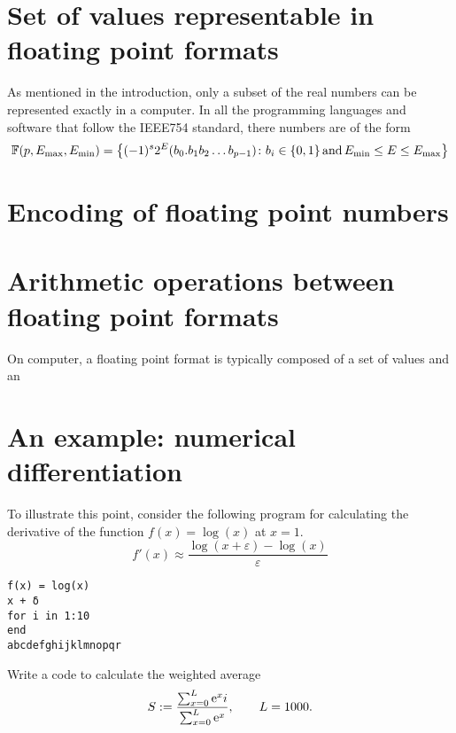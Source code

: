 \section{Set of values representable in floating point formats}%
\label{sec:set_of_values}
As mentioned in the introduction,
only a subset of the real numbers can be represented exactly in a computer.
In all the programming languages and software that follow the IEEE754 standard,
there numbers are of the form
\[
    \mathbb F (p, E_{\max}, E_{\min})
    = \bigl\{ (-1)^s 2^E (b_0. b_1 b_2 \dots b_{p-1}) \colon b_i \in \{0, 1\} \, \text{and} \, E_{\min} \leq E \leq E_{\max} \bigr\}
\]

\section{Encoding of floating point numbers}%
\label{sec:encoding_of_floating_point_numbers}

\section{Arithmetic operations between floating point formats}%
\label{sec:arithmetic_operations_between_floating_point_formats}




On computer, a floating point format is typically composed of a set of values and an

\section{An example: numerical differentiation}%
To illustrate this point,
consider the following program for calculating the derivative of the function $f(x) = \log(x)$ at $x = 1$.
\[
    f'(x) \approx \frac{\log(x + \varepsilon) - \log(x)}{\varepsilon}
\]
\begin{verbatim}
f(x) = log(x)
x + δ
for i in 1:10
end
abcdefghijklmnopqr
\end{verbatim}

\begin{exercise}
    Write a code to calculate the weighted average
    \[
        S := \frac
        {\sum_{x=0}^{L} \mathrm e^x i}
        {\sum_{x=0}^{L} \mathrm e^x},
        \qquad L = 1000.
    \]
\end{exercise}




